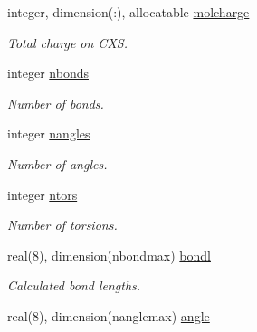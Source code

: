 \begin{DoxyCompactItemize}
\mbox{\label{structchemstr_1_1cxs_a2165bea2105e1c9b3a08e1ff15406cb7}} 
integer, dimension(\+:), allocatable \mbox{\hyperlink{structchemstr_1_1cxs_a2165bea2105e1c9b3a08e1ff15406cb7}{molcharge}}
\begin{DoxyCompactList}\small\item\em Total charge on C\+XS. \end{DoxyCompactList}\item 
\mbox{\label{structchemstr_1_1cxs_a8282facd1672858dd1b986d229c6f2c2}} 
integer \mbox{\hyperlink{structchemstr_1_1cxs_a8282facd1672858dd1b986d229c6f2c2}{nbonds}}
\begin{DoxyCompactList}\small\item\em Number of bonds. \end{DoxyCompactList}\item 
\mbox{\label{structchemstr_1_1cxs_a9acbf74d770156b3aefcc03afba49e8c}} 
integer \mbox{\hyperlink{structchemstr_1_1cxs_a9acbf74d770156b3aefcc03afba49e8c}{nangles}}
\begin{DoxyCompactList}\small\item\em Number of angles. \end{DoxyCompactList}\item 
\mbox{\label{structchemstr_1_1cxs_a455cf0359cfba3c52a7c5c270073fddf}} 
integer \mbox{\hyperlink{structchemstr_1_1cxs_a455cf0359cfba3c52a7c5c270073fddf}{ntors}}
\begin{DoxyCompactList}\small\item\em Number of torsions. \end{DoxyCompactList}\item 
\mbox{\label{structchemstr_1_1cxs_ad735b854a18b6b9c8dbc32f8cd1ffda1}} 
real(8), dimension(nbondmax) \mbox{\hyperlink{structchemstr_1_1cxs_ad735b854a18b6b9c8dbc32f8cd1ffda1}{bondl}}
\begin{DoxyCompactList}\small\item\em Calculated bond lengths. \end{DoxyCompactList}\item 
\mbox{\label{structchemstr_1_1cxs_ab452c2bc96adc4f71b9dada40a1f2573}} 
real(8), dimension(nanglemax) \mbox{\hyperlink{structchemstr_1_1cxs_ab452c2bc96adc4f71b9dada40a1f2573}{angle}}

\end{DoxyCompactItemize}
